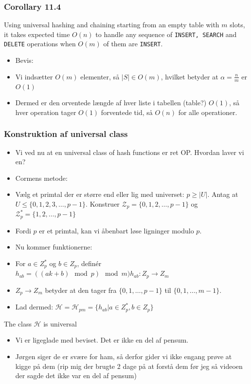 \documentclass{beamer}
\begin{document}
\begin{frame}[allowframebreaks]
  \frametitle{Corollary 11.4}
\begin{corollary}[11.4 Cormen]
Using universal hashing and chaining starting from an empty table with $m$ slots, it takes expected time $O(n)$ to handle any sequence of \texttt{INSERT, SEARCH} and \texttt{DELETE} operations when $O(m)$ of them are \texttt{INSERT}.
\end{corollary}

\begin{itemize}
\item Bevis:
\item Vi indsætter $O(m)$ elementer, så $|S| \in O(m)$, hvilket betyder at $\alpha = \frac{n}{m}$ er $O(1)$
\item Dermed er den orventede længde af hver liste i tabellen (table?) $O(1)$, så hver operation tager $O(1)$ forventede tid, så $O(n)$ for alle operationer. 
\end{itemize}
\end{frame}

\begin{frame}[allowframebreaks]
  \frametitle{Konstruktion af universal class}
 \begin{itemize}
 \item Vi ved nu at en universal class of hash functions er ret OP. Hvordan laver vi en? 
 \item Cormens metode:
 \item Vælg et primtal der er større end eller lig med universet: $p \geq |U|$. Antag at $U \leq \{0, 1, 2, 3, \ldots, p-1\}$. Konstruer $\mathcal{Z} _{p} = \{0,1,2, \ldots, p-1\}$ og $\mathcal{Z}_{p}^{*} = \{1,2, \ldots, p-1\}$
 \item Fordi $p$ er et primtal, kan vi åbenbart løse ligninger modulo $p$. 
 \item Nu kommer funktionerne: 
 \item For $a \in Z_{p}^{*}$ og $b \in Z_{p}$, definér $h_{ab} = ((ak+b) \mod p) \mod m) h_{ab} : Z_{p} \rightarrow Z_{m}$
 \item $Z_{p} \rightarrow Z_{m}$ betyder at den tager fra $\{0, 1, \ldots, p-1\}$ til $\{0, 1, \ldots, m-1\}$.
 \item Lad dermed: $\mathcal{H} = \mathcal{H}_{pm} = \{h_{ab} | a \in Z_{p}^{*}, b \in Z_{p}\}$
 \end{itemize} 

 \begin{theorem}[11.5 Cormen]
The class $\mathcal{H}$ is universal
\end{theorem}
\begin{itemize}
\item Vi er ligeglade med beviset. Det er ikke en del af pensum.
\item Jørgen siger de er svære for ham, så derfor gider vi ikke engang prøve at kigge på dem (rip mig der brugte 2 dage på at forstå dem før jeg så videoen der sagde det ikke var en del af pensum)
\end{itemize}
\end{frame}
\end{document}
